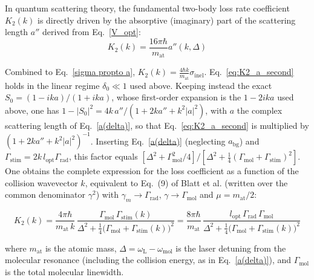 In quantum scattering theory, the fundamental two-body loss rate coefficient $K_2(k)$ is directly driven by the absorptive (imaginary) part of the scattering length $a''$ derived from Eq.~\ref{V_opt}:
\begin{equation}
    K_2(k) = \frac{16\pi\hbar}{m_{\text{at}}} a''(k, \Delta)
    \label{eq:K2_a_second}
\end{equation}

Combined to Eq.~\ref{sigma propto a}, $K_2(k) = \frac{4\hbar k}{m_{\text{at}}}\sigma_{\text{inel}}$.
Eq.~\ref{eq:K2_a_second} holds in the linear regime $\delta_0\ll1$ used above. Keeping instead the
exact $S_0=(1-ika)/(1+ika)$, whose first-order expansion is the $1-2ika$ used above, one has
$1-|S_0|^2=4k\,a''/(1+2ka''+k^2|a|^2)$, with $a$ the complex scattering length of
Eq.~\ref{a(delta)}, so that Eq.~\ref{eq:K2_a_second} is multiplied by
$(1+2ka''+k^2|a|^2)^{-1}$. Inserting Eq.~\ref{a(delta)} (neglecting $a_{\text{bg}}$) and
$\Gamma_{\text{stim}}=2k\,l_{\text{opt}}\Gamma_{\text{rad}}$, this factor equals
$\left[\Delta^2+\Gamma_{\text{mol}}^2/4\right]/\left[\Delta^2+\frac14(\Gamma_{\text{mol}}+\Gamma_{\text{stim}})^2\right]$. 
One obtains the complete expression for
the loss coefficient as a function of the collision wavevector $k$, equivalent to
Eq.~(9) of Blatt et al. \cite{blatt_systematic_2011} (written over the common denominator $\gamma^2$) with $\gamma_m\to\Gamma_{\text{rad}}$,
$\gamma\to\Gamma_{\text{mol}}$ and $\mu=m_{\text{at}}/2$:

\begin{equation}
    K_2(k) = \frac{4\pi\hbar}{m_{\text{at}}\,k}\,
    \frac{\Gamma_{\text{mol}}\,\Gamma_{\text{stim}}(k)}{\Delta^2+\frac14\big(\Gamma_{\text{mol}}+\Gamma_{\text{stim}}(k)\big)^2}
    = \frac{8\pi\hbar}{m_{\text{at}}}\,
    \frac{l_{\text{opt}}\,\Gamma_{\text{rad}}\,\Gamma_{\text{mol}}}{\Delta^2+\frac14\big(\Gamma_{\text{mol}}+\Gamma_{\text{stim}}(k)\big)^2}
    \label{K2 complet Blatt}
\end{equation}

where $m_{\text{at}}$ is the atomic mass, $\Delta = \omega_{\text{L}} - \omega_{\text{mol}}$ is the laser detuning from the molecular resonance (including the collision energy, as in Eq.~\ref{a(delta)}), and $\Gamma_{\text{mol}}$ is the total molecular linewidth.

